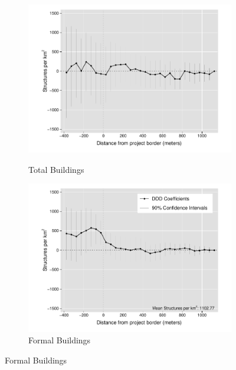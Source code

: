 \documentclass[12pt]{article}
\begin{document}
\begin{figure}[t!]
        \centering
        \begin{subfigure}[b]{0.49\textwidth}
            \centering
            \caption[]{Total Buildings}  
            \vspace{-2mm}
            \includegraphics[width=\textwidth,trim={1cm .8cm .3cm 0cm}, clip=true]{figures/distplotDDD_bblu_total_buildings_admin}
            \label{fig:DDDtotal}
        \end{subfigure}
        \hfill
        \begin{subfigure}[b]{0.49\textwidth}  
            \centering 
            \caption[]{Formal Buildings}
            \vspace{-2mm}
            \includegraphics[width=\textwidth,trim={1cm .8cm .3cm 0cm}, clip=true]{figures/distplotDDD_bblu_for_admin}     

\end{subfigure}
\end{figure}
\end{document}
